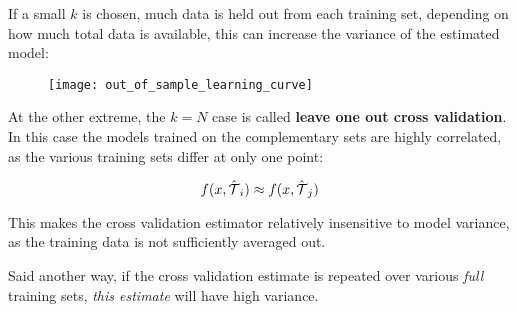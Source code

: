 %
%
\begin{frame}
  If a small $k$ is chosen, much data is held out from each training set,
  depending on how much total data is available, this can increase the variance
  of the estimated model:
  \begin{figure}
    \texttt{[image: out\_of\_sample\_learning\_curve]}
  \end{figure}
\end{frame}
%
%
\begin{frame}
  At the other extreme, the $k = N$ case is called \textbf{leave one out cross
  validation}.  In this case the models trained on the complementary sets are
  highly correlated, as the various training sets differ at only one point:

  $$ f(x, \hat{{\operatorname*{\mathcal{T}}}}_i) \approx  f(x, \hat{{\operatorname*{\mathcal{T}}}}_j) $$
\end{frame}
%
%
\begin{frame}
  This makes the cross validation estimator relatively insensitive to model
  variance, as the training data is not sufficiently averaged out.

  Said another way, if the cross validation estimate is repeated over various
  \textit{full} training sets, \textit{this estimate} will have high variance.
\end{frame}
